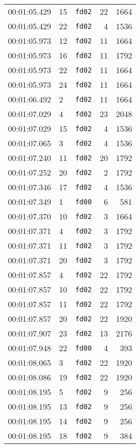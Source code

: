\documentclass{article}
\begin{document}
\begin{longtable}{lllrr}
00:01:05.429 & 15 & \texttt{fd02} & 22 & 1664 \\
00:01:05.429 & 22 & \texttt{fd02} & 4 & 1536 \\
00:01:05.973 & 12 & \texttt{fd02} & 11 & 1664 \\
00:01:05.973 & 16 & \texttt{fd02} & 11 & 1792 \\
00:01:05.973 & 22 & \texttt{fd02} & 11 & 1664 \\
00:01:05.973 & 24 & \texttt{fd02} & 11 & 1664 \\
00:01:06.492 & 2 & \texttt{fd02} & 11 & 1664 \\
00:01:07.029 & 4 & \texttt{fd02} & 23 & 2048 \\
00:01:07.029 & 15 & \texttt{fd02} & 4 & 1536 \\
00:01:07.065 & 3 & \texttt{fd02} & 4 & 1536 \\
00:01:07.240 & 11 & \texttt{fd02} & 20 & 1792 \\
00:01:07.252 & 20 & \texttt{fd02} & 2 & 1792 \\
00:01:07.346 & 17 & \texttt{fd02} & 4 & 1536 \\
00:01:07.349 & 1 & \texttt{fd00} & 6 & 581 \\
00:01:07.370 & 10 & \texttt{fd02} & 3 & 1664 \\
00:01:07.371 & 4 & \texttt{fd02} & 3 & 1792 \\
00:01:07.371 & 11 & \texttt{fd02} & 3 & 1792 \\
00:01:07.371 & 20 & \texttt{fd02} & 3 & 1792 \\
00:01:07.857 & 4 & \texttt{fd02} & 22 & 1792 \\
00:01:07.857 & 10 & \texttt{fd02} & 22 & 1792 \\
00:01:07.857 & 11 & \texttt{fd02} & 22 & 1792 \\
00:01:07.857 & 20 & \texttt{fd02} & 22 & 1920 \\
00:01:07.907 & 23 & \texttt{fd02} & 13 & 2176 \\
00:01:07.948 & 22 & \texttt{fd00} & 4 & 393 \\
00:01:08.065 & 3 & \texttt{fd02} & 22 & 1920 \\
00:01:08.086 & 19 & \texttt{fd02} & 22 & 1920 \\
00:01:08.195 & 5 & \texttt{fd02} & 9 & 256 \\
00:01:08.195 & 13 & \texttt{fd02} & 9 & 256 \\
00:01:08.195 & 14 & \texttt{fd02} & 9 & 256 \\
00:01:08.195 & 18 & \texttt{fd02} & 9 & 384 \\

\end{longtable}
\end{document}
